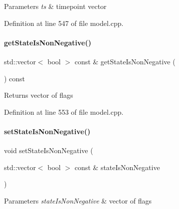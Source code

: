 \begin{DoxyParams}{Parameters}
{\em ts} & timepoint vector \\
\hline
\end{DoxyParams}


Definition at line 547 of file model.\+cpp.

\mbox{\label{classamici_1_1_model_a25b1fc032e0065d80d8bd1041ab84bbf}} 
\paragraph{\texorpdfstring{get\+State\+Is\+Non\+Negative()}{getStateIsNonNegative()}}
{\footnotesize\ttfamily std\+::vector$<$ bool $>$ const  \& get\+State\+Is\+Non\+Negative (\begin{DoxyParamCaption}{ }\end{DoxyParamCaption}) const}

\begin{DoxyReturn}{Returns}
vector of flags 
\end{DoxyReturn}


Definition at line 553 of file model.\+cpp.

\mbox{\label{classamici_1_1_model_a0a50693322a9383d8e98390d9894e841}} 
\paragraph{\texorpdfstring{set\+State\+Is\+Non\+Negative()}{setStateIsNonNegative()}}
{\footnotesize\ttfamily void set\+State\+Is\+Non\+Negative (\begin{DoxyParamCaption}\item[{std\+::vector$<$ bool $>$ const \&}]{state\+Is\+Non\+Negative }\end{DoxyParamCaption})}


\begin{DoxyParams}{Parameters}
{\em state\+Is\+Non\+Negative} & vector of flags \\
\hline
\end{DoxyParams}


